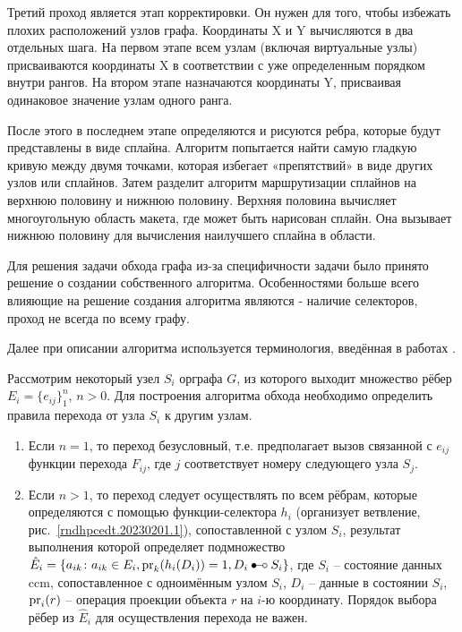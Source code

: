 Третий проход является этап корректировки. Он нужен для того, чтобы избежать плохих расположений узлов графа. Координаты X и Y вычисляются в два отдельных шага. На первом этапе всем узлам (включая виртуальные узлы) присваиваются координаты X в соответствии с уже определенным порядком внутри рангов. На втором этапе назначаются координаты Y, присваивая одинаковое значение узлам одного ранга. 

После этого в последнем этапе определяются и рисуются ребра, которые будут представлены в виде сплайна. Алгоритм попытается найти самую гладкую кривую между двумя точками, которая избегает «препятствий» в виде других узлов или сплайнов. Затем разделит алгоритм маршрутизации сплайнов на верхнюю половину и нижнюю половину. Верхняя половина вычисляет многоугольную область макета, где может быть нарисован сплайн. Она вызывает нижнюю половину для вычисления наилучшего сплайна в области\cite{alg-dot}.

Для решения задачи обхода графа из-за специфичности задачи было принято решение о создании собственного алгоритма. Особенностями больше всего влияющие на решение создания алгоритма являются - наличие селекторов, проход не всегда по всему графу.

Далее при описании алгоритма используется терминология, введённая в работах \cite{SokPersh2019PCS, SokGolub2021GBSEBL}.

Рассмотрим некоторый узел $S_i$ орграфа $G$, из которого выходит множество рёбер $E_i=\{e_{ij}\}_1^n$, $n>0$. Для построения алгоритма обхода необходимо определить правила перехода от узла $S_{i}$ к другим узлам.
\begin{enumerate}
  \item Если $n=1$, то переход безусловный, т.е. предполагает вызов связанной с $e_{ij}$ функции перехода $F_{ij}$, где $j$ соответствует номеру следующего узла $S_j$.
  \item Если $n>1$, то переход следует осуществлять по всем рёбрам, которые определяются с помощью функции-селектора $h_i$ (организует ветвление, рис.~\ref{rndhpcedt.20230201.1}), сопоставленной с узлом $S_i$, результат выполнения которой определяет подмножество $\hat{E}_i=\{a_{ik}\colon {a_{ik}\in E_i}, {\pr_k(h_i(D_i))=1}, {D_i \filledemptyspoon S_i}\}$, где $S_i$ -- состояние данных \gls{ccm}, сопоставленное с одноимённым узлом $S_{i}$, $D_i$ -- данные в состоянии $S_i$, $\operatorname{pr}_{i}(r)$ -- операция проекции объекта $r$ на $i$-ю координату. Порядок выбора рёбер из $\hat{E}_i$ для осуществления перехода не важен.
\end{enumerate}

